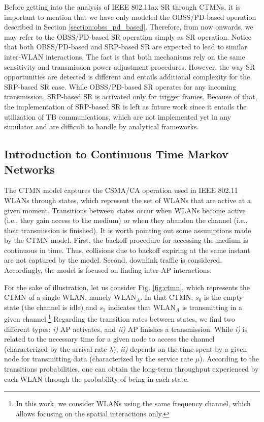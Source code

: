 \documentclass[comsoc]{IEEEtran}
\begin{document}
	Before getting into the analysis of IEEE 802.11ax SR through CTMNs, it is important to mention that we have only modeled the OBSS/PD-based operation described in Section \ref{section:obss_pd_based}. Therefore, from now onwards, we may refer to the OBSS/PD-based SR operation simply as SR operation. Notice that both OBSS/PD-based and SRP-based SR are expected to lead to similar inter-WLAN interactions. The fact is that both mechanisms rely on the same sensitivity and transmission power adjustment procedures. However, the way SR opportunities are detected is different and entails additional complexity for the SRP-based SR case. While OBSS/PD-based SR operates for any incoming transmission, SRP-based SR is activated only for trigger frames. Because of that, the implementation of SRP-based SR is left as future work since it entails the utilization of TB communications, which are not implemented yet in any simulator and are difficult to handle by analytical frameworks. 
	
	\subsection{Introduction to Continuous Time Markov Networks}
	
	The CTMN model captures the CSMA/CA operation used in IEEE 802.11 WLANs through states, which represent the set of WLANs that are active at a given moment. Transitions between states occur when WLANs become active (i.e., they gain access to the medium) or when they abandon the channel (i.e., their transmission is finished). It is worth pointing out some assumptions made by the CTMN model. First, the backoff procedure for accessing the medium is continuous in time. Thus, collisions due to backoff expiring at the same instant are not captured by the model. Second, downlink traffic is considered. Accordingly, the model is focused on finding inter-AP interactions.
	
	For the sake of illustration, let us consider Fig. \ref{fig:ctmn}, which represents the CTMN of a single WLAN, namely $\text{WLAN}_A$. In that CTMN, $s_0$ is the empty state (the channel is idle) and $s_1$ indicates that $\text{WLAN}_A$ is transmitting in a given channel.\footnote{In this work, we consider WLANs using the same frequency channel, which allows focusing on the spatial interactions only.} Regarding the transition rates between states, we find two different types: \emph{i)} AP activates, and \emph{ii)} AP finishes a transmission. While \emph{i)} is related to the necessary time for a given node to access the channel (characterized by the arrival rate $\lambda$), \emph{ii)} depends on the time spent by a given node for transmitting data (characterized by the service rate $\mu$). According to the transitions probabilities, one can obtain the long-term throughput experienced by each WLAN through the probability of being in each state.
	
\end{document}
